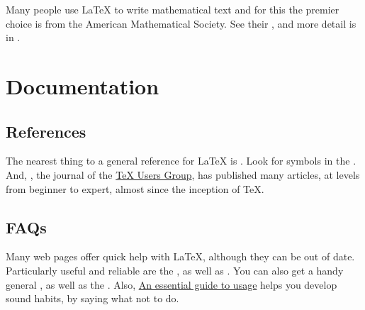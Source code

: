 \documentclass[11pt]{article}
\begin{document}
\begin{multicols*}{2}
Many people use \LaTeX{} to write mathematical text and
for this the premier choice is from the American Mathematical Society. 
See their
\href{http://mirror.ctan.org/info/amslatex/primer/amshelp.pdf}
 {},
and more detail is in 
\href{http://mirror.ctan.org/macros/latex/required/amsmath/amsldoc.pdf}
 {}.




\section{Documentation}


\subsection{References}  
The nearest thing to a general reference for \LaTeX{} is
\href{http://mirror.ctan.org/info/latex2e-help-texinfo/latex2e.html}
 {}.
Look for symbols in the
\href{http://mirror.ctan.org/info/symbols/comprehensive/symbols-letter.pdf}
 {}.
And, \href{https://tug.org/TUGboat/}{}, 
the journal of the  
\href{https://tug.org}{\TeX{} Users Group},
has published many articles, at levels from beginner to expert, 
almost since the inception of \TeX{}.



\subsection{FAQs}
Many web pages offer quick help with \LaTeX{},
although they can be out of date.
Particularly useful and reliable are the
\href{https://texfaq.org/}{}, 
as well as
\href{https://tug.org/interest.html}{}.
You can also get a handy general
\href{http://mirror.ctan.org/info/latexcheat/latexcheat/latexsheet.pdf}
 {},
as well as the
\href{http://mirrors.ctan.org/info/undergradmath/undergradmath.pdf}
 {}.
Also,
\href{http://mirror.ctan.org/info/l2tabu/english/l2tabuen.pdf}
 {An essential guide to \LaTeXe{} usage}
helps you develop sound habits, by
saying what not to do.


\end{multicols*}
\end{document}
